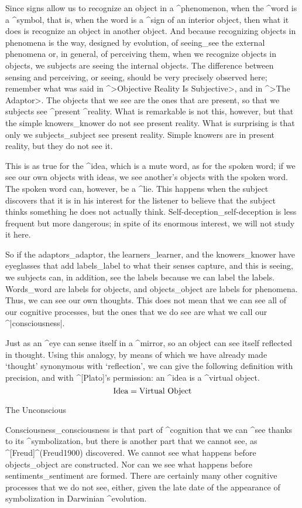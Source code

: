 Since signs allow us to recognize an object in a ^{phenomenon}, when the
^{word} is a ^{symbol}, that is, when the word is a ^{sign} of an
interior object, then what it does is recognize an object in another
object. And because recognizing objects in phenomena is the way,
designed by evolution, of seeing_{see} the external phenomena or, in
general, of perceiving them, when we recognize objects in objects, we
subjects are seeing the internal objects. The difference between sensing
and perceiving, or seeing, should be very precisely observed here;
remember what was said in ^>Objective Reality Is Subjective>, and in
^>The Adaptor>. The objects that we see are the ones that are present,
so that we subjects see ^{present} ^{reality}. What is remarkable is not
this, however, but that the simple knowers_{knower} do not see present
reality. What is surprising is that only we subjects_{subject} see
present reality. Simple knowers are in present reality, but they do not
see it.

This is as true for the ^{idea}, which is a mute word, as for the spoken
word; if we see our own objects with ideas, we see another's objects
with the spoken word. The spoken word can, however, be a ^{lie}. This
happens when the subject discovers that it is in his interest for the
listener to believe that the subject thinks something he does not
actually think. Self-deception_{self-deception} is less frequent but
more dangerous; in spite of its enormous interest, we will not study it
here.

So if the adaptors_{adaptor}, the learners_{learner}, and the
knowers_{knower} have eyeglasses that add labels_{label} to what their
senses capture, and this is seeing, we subjects can, in addition, see
the labels because we can label the labels. Words_{word} are labels for
objects, and objects_{object} are labels for phenomena. Thus, we can see
our own thoughts. This does not mean that we can see all of our
cognitive processes, but the ones that we do see are what we call our
^|consciousness|.

Just as an ^{eye} can sense itself in a ^{mirror}, so an object can see
itself reflected in thought. Using this analogy, by means of which we
have already made `thought' synonymous with `reflection', we can give
the following definition with precision, and with ^[Plato]'s permission:
an ^{idea} is a ^{virtual object}.
$$\hbox{Idea} = \hbox{Virtual Object}$$


\Section The Unconscious

Consciousness_{consciousness} is that part of ^{cognition} that we can
^{see} thanks to its ^{symbolization}, but there is another part that we
cannot see, as ^[Freud]^(Freud1900) discovered. We cannot see what
happens before objects_{object} are constructed. Nor can we see what
happens before sentiments_{sentiment} are formed. There are certainly
many other cognitive processes that we do not see, either, given the
late date of the appearance of symbolization in Darwinian ^{evolution}.

